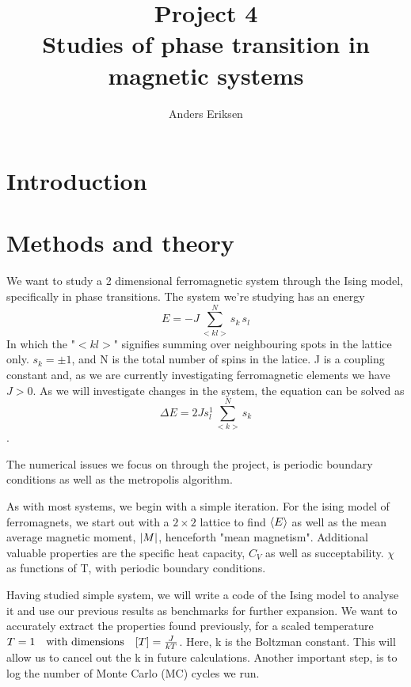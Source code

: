 \documentclass[10pt, twocolumn]{revtex4-1}
\begin{document}
\title{%
    Project 4\\
    \large Studies of phase transition in magnetic systems}
\author{Anders Eriksen}
\begin{abstract}
\end{abstract}
\maketitle

\section{Introduction}


\section{Methods and theory}

We want to study a 2 dimensional ferromagnetic system through the Ising model, specifically in phase transitions.
The system we're studying has an energy 
\[ E = -J \sum_{<kl>}^N s_k \, s_l \]
In which the "$<kl>$" signifies summing over neighbouring spots in the lattice only. $s_k = \pm 1$, and N is the total number of spins in 
the latice. J is a coupling constant and, as we are currently investigating ferromagnetic elements we have $J > 0$.
As we will investigate changes in the system, the equation can be solved as
\[ \Delta E = 2 Js_l^1 \sum_{<k>}^N s_k \].

The numerical issues we focus on through the project, is periodic boundary conditions as well as the metropolis algorithm. %

As with most systems, we begin with a simple iteration. For the ising model of ferromagnets, we start out with a $2\times 2$ lattice to find $\ev{E}$
as well as the mean average magnetic moment, $\abs{M}$, henceforth "mean magnetism". Additional valuable properties are the specific heat capacity, $C_V$
as well as succeptability. $\chi$ as functions of T, with periodic boundary conditions. 

Having studied simple system, we will write a code of the Ising model to analyse it and use our previous results as benchmarks for further expansion. We 
want to accurately extract the properties found previously, for a scaled temperature $T = 1 \qq{with dimensions} \qty[ T ] = \frac{ J }{ kT }$. Here, 
k is the Boltzman constant. This will allow us to cancel out the k in future calculations. Another important step, is to log the number of Monte Carlo
(MC) cycles we run. 
\end{document}
